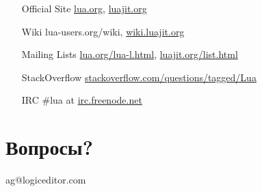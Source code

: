 \documentclass[aspectratio=169,handout,bigger]{beamer}
\begin{document}
\begin{frame}
  \begin{center}
  \begin{minipage}{0.6\linewidth}
  \begin{itemize}
    \item[Official Site] \url{lua.org}, \url{luajit.org}
    \item[Wiki] lua-users.org/wiki, \url{wiki.luajit.org}
    \item[Mailing Lists] \url{lua.org/lua-l.html}, \url{luajit.org/list.html}
    \item[StackOverflow] \url{stackoverflow.com/questions/tagged/Lua}
    \item[IRC] \#lua at \url{irc.freenode.net}
  \end{itemize}
  \end{minipage}
  \end{center}
\end{frame}


\section*{Вопросы?}

\begin{frame}

\begin{center}
\Huge{ag@logiceditor.com}
\end{center}

\end{frame}

\end{document}

